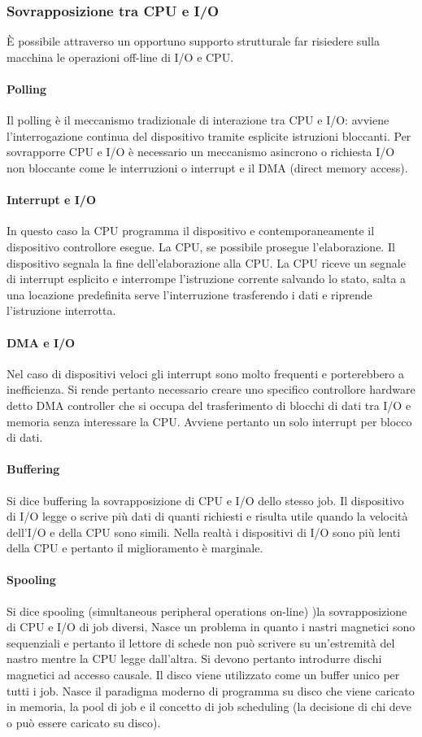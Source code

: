 \subsubsection{Sovrapposizione tra CPU e I/O}
\`E possibile attraverso un opportuno supporto strutturale far risiedere sulla macchina le operazioni off-line di I/O e CPU. 
\paragraph{Polling}
Il polling \`e il meccanismo tradizionale di interazione tra CPU e I/O: avviene l'interrogazione continua del dispositivo tramite esplicite istruzioni bloccanti. Per sovrapporre CPU e I/O \`e necessario un 
meccanismo asincrono o richiesta  I/O non bloccante come le interruzioni o interrupt e il DMA (direct memory access). 
\paragraph{Interrupt e I/O}
In questo caso la CPU programma il dispositivo e contemporaneamente il dispositivo controllore esegue. La CPU, se possibile prosegue l'elaborazione. Il dispositivo segnala la fine dell'elaborazione alla CPU. La
CPU riceve un segnale di interrupt esplicito e interrompe l'istruzione corrente salvando lo stato, salta a una locazione predefinita serve l'interruzione trasferendo i dati e riprende l'istruzione interrotta. 
\paragraph{DMA e I/O}
Nel caso di dispositivi veloci gli interrupt sono molto frequenti e porterebbero a inefficienza. Si rende pertanto necessario creare uno specifico controllore hardware detto DMA controller che si occupa del 
trasferimento di blocchi di dati tra I/O e memoria senza interessare la CPU. Avviene pertanto un solo interrupt per blocco di dati. 
\paragraph{Buffering}
Si dice buffering la sovrapposizione di CPU e I/O dello stesso job. Il dispositivo di I/O legge o scrive pi\`u dati di quanti richiesti e risulta utile quando la velocit\`a dell'I/O e della CPU sono simili. Nella realt\`a i 
dispositivi di I/O sono pi\`u lenti della CPU e pertanto il miglioramento \`e marginale.
\paragraph{Spooling}
Si dice spooling (simultaneous peripheral operations on-line) )la sovrapposizione di CPU e I/O di job diversi, Nasce un problema in quanto i nastri magnetici sono sequenziali e pertanto il lettore di schede non 
pu\`o scrivere su un'estremit\`a del nastro mentre la CPU legge dall'altra. Si devono pertanto introdurre dischi magnetici ad accesso causale. Il disco viene utilizzato come un buffer unico per tutti i job. Nasce 
il paradigma moderno di programma su disco che viene caricato in memoria, la pool di job e il concetto di job scheduling (la decisione di chi deve o pu\`o essere caricato su disco). 

